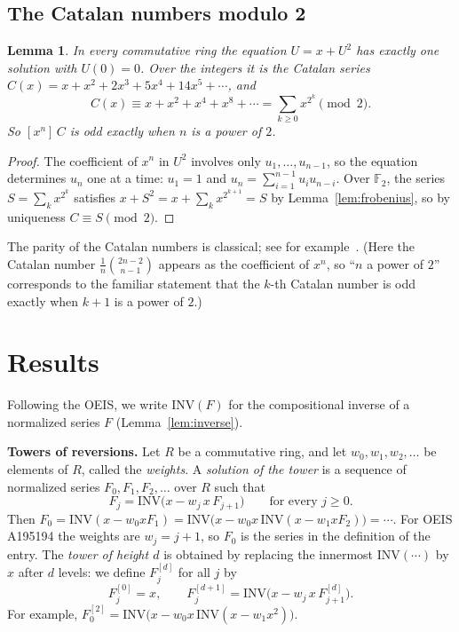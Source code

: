\documentclass[11pt,a4paper]{article}
\newtheorem{lemma}[theorem]{Lemma}
\theoremstyle{definition}
\theoremstyle{remark}
\newcommand{\F}{\mathbb{F}}
\newcommand{\coeff}[2]{[x^{#1}]\,#2}
\newcommand{\para}[1]{\par\medskip\noindent\textbf{#1}\enspace}
\begin{document}
\subsection{The Catalan numbers modulo 2}
\begin{lemma}\label{lem:catalan}
In every commutative ring the equation $U=x+U^2$ has exactly one solution with $U(0)=0$. Over the integers it is the
Catalan series $C(x)=x+x^2+2x^3+5x^4+14x^5+\cdots$, and
\[
C(x)\equiv x+x^2+x^4+x^8+\cdots=\sum_{k\ge0}x^{2^k}\pmod 2 .
\]
So $\coeff{n}{C}$ is odd exactly when $n$ is a power of $2$.
\end{lemma}

\begin{proof}
The coefficient of $x^n$ in $U^2$ involves only $u_1,\dots,u_{n-1}$, so the equation determines $u_n$ one at a time:
$u_1=1$ and $u_n=\sum_{i=1}^{n-1}u_iu_{n-i}$. Over $\F_2$, the series $S=\sum_kx^{2^k}$ satisfies
$x+S^2=x+\sum_kx^{2^{k+1}}=S$ by Lemma~\ref{lem:frobenius}, so by uniqueness $C\equiv S\pmod2$.
\end{proof}
The parity of the Catalan numbers is classical; see for example~\cite{deutschsagan}. (Here the Catalan number
$\frac1{n}\binom{2n-2}{n-1}$ appears as the coefficient of $x^n$, so ``$n$ a power of $2$'' corresponds to the familiar
statement that the $k$-th Catalan number is odd exactly when $k+1$ is a power of $2$.)

\section{Results}\label{sec:results}

Following the OEIS, we write $\mathrm{INV}(F)$ for the compositional inverse of a normalized series $F$
(Lemma~\ref{lem:inverse}).

\para{Towers of reversions.} Let $R$ be a commutative ring, and let $w_0,w_1,w_2,\dots$ be elements of $R$, called the
\emph{weights}. A \emph{solution of the tower} is a sequence of normalized series $F_0,F_1,F_2,\dots$ over $R$ such that
\begin{equation}\label{eq:tails}
F_j=\mathrm{INV}\bigl(x-w_j\,x\,F_{j+1}\bigr)\qquad\text{for every }j\ge0 .
\end{equation}
Then $F_0=\mathrm{INV}(x-w_0xF_1)=\mathrm{INV}\bigl(x-w_0x\,\mathrm{INV}(x-w_1xF_2)\bigr)=\cdots$. For OEIS A195194 the
weights are $w_j=j+1$, so $F_0$ is the series in the definition of the entry. The \emph{tower of height $d$} is obtained
by replacing the innermost $\mathrm{INV}(\cdots)$ by $x$ after $d$ levels: we define $F^{[d]}_j$ for all $j$ by
\[
F^{[0]}_j=x,\qquad F^{[d+1]}_j=\mathrm{INV}\bigl(x-w_j\,x\,F^{[d]}_{j+1}\bigr).
\]
For example, $F^{[2]}_0=\mathrm{INV}\bigl(x-w_0x\,\mathrm{INV}(x-w_1x^2)\bigr)$.
\end{document}
